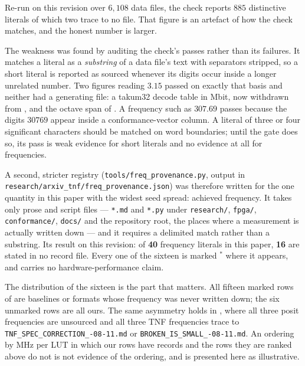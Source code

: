 Re-run on this revision over $6{,}108$ data files, the check reports $885$
distinctive literals of which two trace to no file. That figure is an artefact of
how the check matches, and the honest number is larger.

The weakness was found by auditing the check's passes rather than its failures. It
matches a literal as a \emph{substring} of a data file's text with separators
stripped, so a short literal is reported as sourced whenever its digits occur
inside a longer unrelated number. Two figures reading $3.15$ passed on exactly that
basis and neither had a generating file: a takum32 decode table in Mbit, now
withdrawn from , and the octave span of
. A frequency such as $307.69$ passes because the
digits $30769$ appear inside a conformance-vector column. A literal of three or
four significant characters should be matched on word boundaries; until the gate
does so, its pass is weak evidence for short literals and no evidence at all for
frequencies.

A second, stricter registry (\texttt{tools/}\allowbreak\texttt{freq\_provenance.py},
output in \texttt{research/}\allowbreak\texttt{arxiv\_tnf/}\allowbreak\texttt{freq\_provenance.json}) was therefore written for the
one quantity in this paper with the widest seed spread: achieved frequency. It
takes only prose and script files --- \texttt{*.md} and \texttt{*.py} under
\texttt{research/}, \texttt{fpga/}, \texttt{conformance/}, \texttt{docs/} and the
repository root, the places where a measurement is actually written down --- and it
requires a delimited match rather than a substring. Its result on this revision:
of \textbf{40} frequency literals in this paper, \textbf{16} are stated in no
record file. Every one of the sixteen is marked $^{\ast}$ where it appears, and
carries no hardware-performance claim.

The distribution of the sixteen is the part that matters. All fifteen marked rows
of  are baselines or formats whose frequency was
never written down; the six unmarked rows are all ours. The same asymmetry holds in
, where all three posit frequencies are unsourced and all three
TNF frequencies trace to
\texttt{TNF\_\allowbreak SPEC\_\allowbreak CORRECTION\_-08-11.md} or
\texttt{BROKEN\_\allowbreak IS\_\allowbreak SMALL\_-08-11.md}. An ordering by MHz per LUT in which our
rows have records and the rows they are ranked above do not is not evidence of the
ordering, and is presented here as illustrative.

